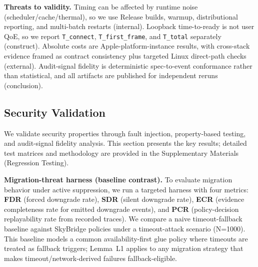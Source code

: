 \documentclass[10pt,journal,compsoc]{IEEEtran}
\begin{document}
\textbf{Threats to validity.} Timing can be affected by runtime noise
(scheduler/cache/thermal), so we use Release builds, warmup,
distributional reporting, and multi-batch restarts (internal). Loopback
time-to-ready is not user QoE, so we report \texttt{T\_connect},
\texttt{T\_first\_frame}, and \texttt{T\_total} separately (construct).
Absolute costs are Apple-platform-instance results, with cross-stack
evidence framed as contract consistency plus targeted Linux direct-path
checks (external). Audit-signal fidelity is deterministic spec-to-event
conformance rather than statistical, and all artifacts are published for
independent reruns (conclusion).

\subsection{Security Validation}\label{b.-security-centric-evaluation}

We validate security properties through fault injection, property-based
testing, and audit-signal fidelity analysis. This section presents the
key results; detailed test matrices and methodology are provided in the
Supplementary Materials (Regression Testing).

\textbf{Migration-threat harness (baseline contrast).}
To evaluate migration behavior under active suppression, we run a
targeted harness with four metrics:
\textbf{FDR} (forced downgrade rate), \textbf{SDR} (silent downgrade
rate), \textbf{ECR} (evidence completeness rate for emitted downgrade
events), and \textbf{PCR} (policy-decision replayability rate from
recorded traces). We compare a naive timeout-fallback baseline against
SkyBridge policies under a timeout-attack scenario (N=1000).
This baseline models a common availability-first glue policy where timeouts are treated as fallback triggers; Lemma~L1 applies to any migration strategy that makes timeout/network-derived failures fallback-eligible.
\end{document}
